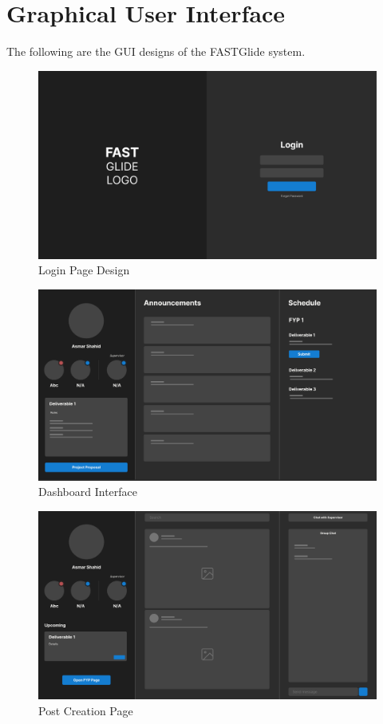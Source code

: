 \documentclass{FastFyp}
\begin{document}
\section{Graphical User Interface}
The following are the GUI designs of the FASTGlide system.

\begin{figure}[H]
    \centering
    \includegraphics[width=\textwidth]{Figures/gui1}
    \caption{Login Page Design}
\end{figure}

\begin{figure}[H]
    \centering
    \includegraphics[width=\textwidth]{Figures/gui2}
    \caption{Dashboard Interface}
\end{figure}

\begin{figure}[H]
    \centering
    \includegraphics[width=\textwidth]{Figures/gui3}
    \caption{Post Creation Page}
\end{figure}
\end{document}
